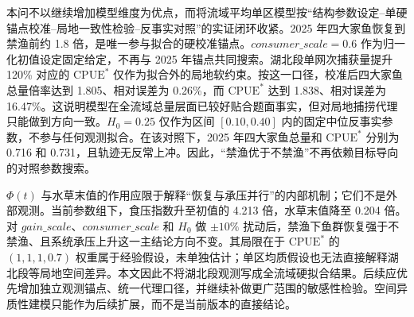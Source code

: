 本问不以继续增加模型维度为优点，而将流域平均单区模型按“结构参数设定--单硬锚点校准--局地一致性检验--反事实对照”的实证闭环收紧。2025 年四大家鱼恢复到禁渔前约 1.8 倍，是唯一参与拟合的硬校准锚点。\(consumer\_scale=0.6\) 作为归一化初值设定固定给定，不再与 2025 年锚点共同搜索。湖北段单网次捕获量提升 120\% 对应的 \(\mathrm{CPUE}^*\) 仅作为拟合外的局地软约束。按这一口径，校准后四大家鱼总量倍率达到 1.805、相对误差为 0.26\%，而 \(\mathrm{CPUE}^*\) 达到 1.838、相对误差为 16.47\%。这说明模型在全流域总量层面已较好贴合题面事实，但对局地捕捞代理只能做到方向一致。\(H_0=0.25\) 仅作为区间 \([0.10,0.40]\) 内的固定中位反事实参数，不参与任何观测拟合。在该对照下，2025 年四大家鱼总量和 \(\mathrm{CPUE}^*\) 分别为 0.716 和 0.731，且轨迹无反常上冲。因此，“禁渔优于不禁渔”不再依赖目标导向的对照参数搜索。

\(\Phi(t)\) 与水草末值的作用应限于解释“恢复与承压并行”的内部机制；它们不是外部观测。当前参数组下，食压指数升至初值的 4.213 倍，水草末值降至 0.204 倍。对 \(gain\_scale\)、\(consumer\_scale\) 和 \(H_0\) 做 \(\pm10\%\) 扰动后，禁渔下鱼群恢复强于不禁渔、且系统承压上升这一主结论方向不变。其局限在于 \(\mathrm{CPUE}^*\) 的 \((1,1,1,0.7)\) 权重属于经验假设，未单独估计；单区均质假设也无法直接解释湖北段等局地空间差异。本文因此不将湖北段观测写成全流域硬拟合结果。后续应优先增加独立观测锚点、统一代理口径，并继续补做更广范围的敏感性检验。空间异质性建模只能作为后续扩展，而不是当前版本的直接结论。
